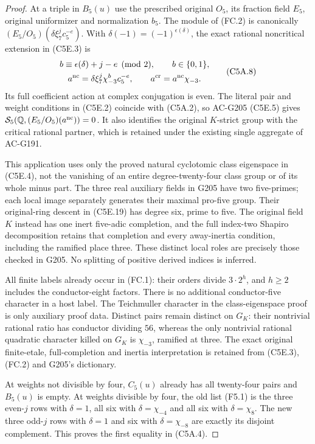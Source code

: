 \begin{proof}
At a triple in $B_5(u)$ use the prescribed original $O_5$, its
fraction field $E_5$, original uniformizer and normalization $b_5$.
The module of (FC.2) is canonically
$(E_5/O_5)(\delta\xi_7^j c_5^{-e})$.
With $\delta(-1)=(-1)^{\epsilon(\delta)}$, the exact rational
noncritical extension in (C5E.3) is
\[
 \begin{gathered}
 b\equiv\epsilon(\delta)+j-e\pmod2,\qquad b\in\{0,1\},\\
 a^{\rm nc}=\delta\xi_7^j\chi_{-3}^{b}c_5^{-e},\qquad
 a^{\rm cr}=a^{\rm nc}\chi_{-3}.
 \end{gathered}\tag{C5A.8}
\]
Its full coefficient action at complex conjugation is even.
The literal pair and weight conditions in (C5E.2) coincide with
(C5A.2), so AC-G205 (C5E.5) gives
$\mathcal S_5(\mathbb Q,(E_5/O_5)(a^{\rm nc}))=0$.
It also identifies the original $K$-strict group with the
critical rational partner, which is retained under the existing
single aggregate of AC-G191.

This application uses only the proved natural cyclotomic class
eigenspace in (C5E.4), not the vanishing of an entire degree-twenty-four
class group or of its whole minus part.
The three real auxiliary fields in G205 have two five-primes;
each local image separately generates their maximal pro-five group.
Their original-ring descent in (C5E.19) has degree six, prime to five.
The original field $K$ instead has one inert five-adic completion,
and the full index-two Shapiro decomposition retains that completion
and every away-inertia condition, including the ramified place three.
These distinct local roles are precisely those checked in G205.
No splitting of positive derived indices is inferred.

All finite labels already occur in (FC.1): their orders divide
$3\cdot2^h$, and $h\geq2$ includes the conductor-eight factors.
There is no additional conductor-five character in a host label.
The Teichmuller character in the class-eigenspace proof is only
auxiliary proof data. Distinct pairs remain distinct on $G_K$:
their nontrivial rational ratio has conductor dividing $56$,
whereas the only nontrivial rational quadratic character killed
on $G_K$ is $\chi_{-3}$, ramified at three.
The exact original finite-etale, full-completion and inertia
interpretation is retained from (C5E.3), (FC.2) and G205's dictionary.

At weights not divisible by four, $C_5(u)$ already has all
twenty-four pairs and $B_5(u)$ is empty.
At weights divisible by four, the old list (F5.1) is the
three even-$j$ rows with $\delta=1$, all six with
$\delta=\chi_{-4}$ and all six with $\delta=\chi_8$.
The new three odd-$j$ rows with $\delta=1$ and six with
$\delta=\chi_{-8}$ are exactly its disjoint complement.
This proves the first equality in (C5A.4).


\end{proof}
